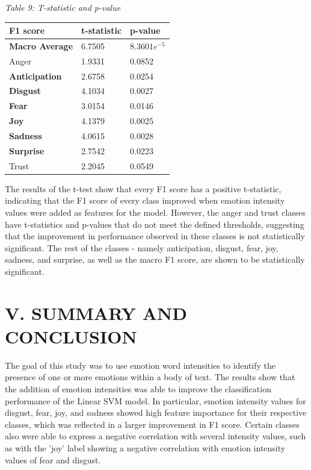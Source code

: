 \documentclass{icsthesis}
\begin{document}
\begin{mainmatter}
                \begin{table}[h!]
                    \centering
                    \emph{Table 9: T-statistic and p-value}\\
                    \begin{tabular}{|l|l|l|}
                        \hline
                        F1 score     & t-statistic & p-value        \\ \hline
                        \textbf{Macro Average}     & 6.7505      & $8.3601e^{-5}$ \\ \hline
                        Anger        & 1.9331      & 0.0852         \\ \hline
                        \textbf{Anticipation} & 2.6758      & 0.0254         \\ \hline
                        \textbf{Disgust}      & 4.1034      & 0.0027         \\ \hline
                        \textbf{Fear}         & 3.0154      & 0.0146         \\ \hline
                        \textbf{Joy}          & 4.1379      & 0.0025         \\ \hline
                        \textbf{Sadness}      & 4.0615      & 0.0028         \\ \hline
                        \textbf{Surprise}     & 2.7542      & 0.0223         \\ \hline
                        Trust        & 2.2045      & 0.0549         \\ \hline
                    \end{tabular}%
                \end{table}
                
                The results of the t-test show that every F1 score has a positive t-statistic, indicating that the F1 score of every class improved when emotion intensity values were added as features for the model. However, the anger and trust classes have t-statistics and p-values that do not meet the defined thresholds, suggesting that the improvement in performance observed in these classes is not statistically significant. The rest of the classes - namely anticipation, disgust, fear, joy, sadness, and surprise, as well as the macro F1 score, are shown to be statistically significant.
		
		\section{V. SUMMARY AND CONCLUSION}
			The goal of this study was to use emotion word intensities to identify the presence of one or more emotions within a body of text. The results show that the addition of emotion intensities was able to improve the classification performance of the Linear SVM model. In particular, emotion intensity values for disgust, fear, joy, and sadness showed high feature importance for their respective classes, which was reflected in a larger improvement in F1 score. Certain classes also were able to express a negative correlation with several intensity values, such as with the 'joy' label showing a negative correlation with emotion intensity values of fear and disgust.


\end{mainmatter}
\end{document}

